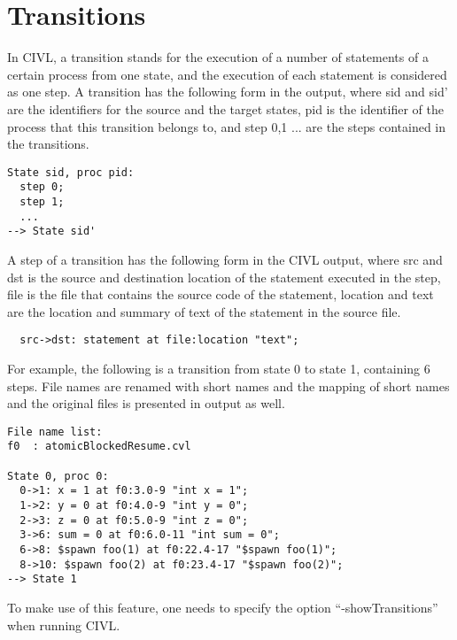 \documentclass[11pt, oneside, letterpaper]{book}
\begin{document}
\chapter{Transitions}
In CIVL, a transition stands for the execution of a number of statements of a certain process from one state, and the execution of each statement is considered as one step. A transition has the following form in the output, where sid and sid' are the identifiers for the source and the target states, pid is the identifier of the process that this transition belongs to, and step 0,1 ... are the steps contained in the transitions.

\begin{verbatim}
State sid, proc pid: 
  step 0;
  step 1;
  ...
--> State sid'
\end{verbatim}

A step of a transition has the following form in the CIVL output, where src and dst is the source and destination location of the statement executed in the step, file is the file that contains the source code of the statement, location and text are the location and summary of text of the statement in the source file.

\begin{verbatim}
  src->dst: statement at file:location "text";
\end{verbatim}

For example, the following is a transition from state 0 to state 1, containing 6 steps. File names are renamed with short names and the mapping of short names and the original files is presented in output as well.

\begin{verbatim}
File name list:
f0	: atomicBlockedResume.cvl

State 0, proc 0: 
  0->1: x = 1 at f0:3.0-9 "int x = 1";
  1->2: y = 0 at f0:4.0-9 "int y = 0";
  2->3: z = 0 at f0:5.0-9 "int z = 0";
  3->6: sum = 0 at f0:6.0-11 "int sum = 0";
  6->8: $spawn foo(1) at f0:22.4-17 "$spawn foo(1)";
  8->10: $spawn foo(2) at f0:23.4-17 "$spawn foo(2)";
--> State 1
\end{verbatim}

To make use of this feature, one needs to specify the option ``-showTransitions'' when running CIVL.



\end{document}
